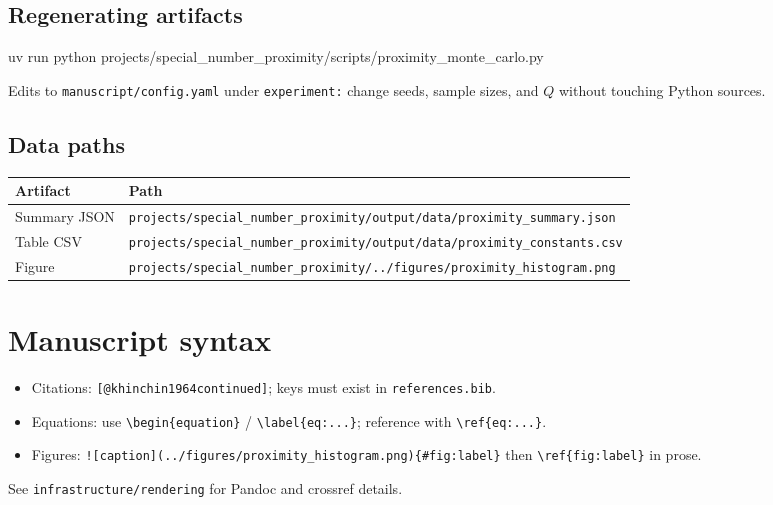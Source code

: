 \documentclass[
]{article}
\newenvironment{Shaded}{}{}
\newcommand{\ExtensionTok}[1]{#1}
\newcommand{\NormalTok}[1]{#1}
\newcounter{none} %
\providecommand{\tightlist}{%
  \setlength{\itemsep}{0pt}\setlength{\parskip}{0pt}}
\begin{document}
\subsection{Regenerating artifacts}\label{regenerating-artifacts}

\begin{Shaded}
\begin{Highlighting}[]
\ExtensionTok{uv}\NormalTok{ run python projects/special\_number\_proximity/scripts/proximity\_monte\_carlo.py}
\end{Highlighting}
\end{Shaded}

Edits to \texttt{manuscript/config.yaml} under \texttt{experiment:}
change seeds, sample sizes, and \(Q\) without touching Python sources.

\subsection{Data paths}\label{data-paths}

{\def\LTcaptype{none} %
\begin{longtable}[]{@{}
  >{\raggedright\arraybackslash}p{}
  >{\raggedright\arraybackslash}p{}@{}}
\toprule\noalign{}
\begin{minipage}[b]{\linewidth}\raggedright
Artifact
\end{minipage} & \begin{minipage}[b]{\linewidth}\raggedright
Path
\end{minipage} \\
\midrule\noalign{}
\endhead
\bottomrule\noalign{}
\endlastfoot
Summary JSON &
\texttt{projects/special\_number\_proximity/output/data/proximity\_summary.json} \\
Table CSV &
\texttt{projects/special\_number\_proximity/output/data/proximity\_constants.csv} \\
Figure &
\texttt{projects/special\_number\_proximity/../figures/proximity\_histogram.png} \\
\end{longtable}
}

\newpage

\section{Manuscript syntax}\label{manuscript-syntax}

\begin{itemize}
\tightlist
\item
  Citations: \texttt{{[}@khinchin1964continued{]}}; keys must exist in
  \texttt{references.bib}.
\item
  Equations: use \texttt{\textbackslash{}begin\{equation\}} /
  \texttt{\textbackslash{}label\{eq:...\}}; reference with
  \texttt{\textbackslash{}ref\{eq:...\}}.
\item
  Figures:
  \texttt{!{[}caption{]}(../figures/proximity\_histogram.png)\{\#fig:label\}}
  then \texttt{\textbackslash{}ref\{fig:label\}} in prose.
\end{itemize}

See \texttt{infrastructure/rendering} for Pandoc and crossref details.




\end{document}
